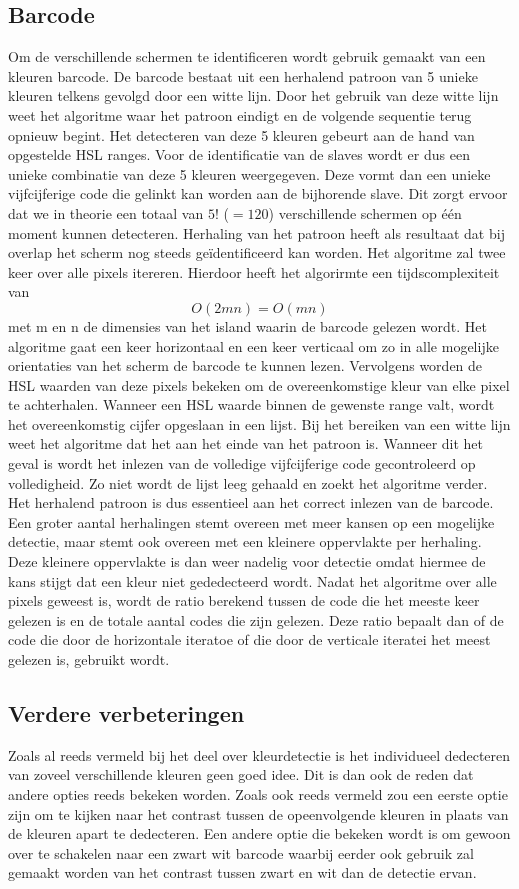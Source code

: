  \subsection{Barcode}
Om de verschillende schermen te identificeren wordt gebruik gemaakt van een kleuren barcode. De barcode bestaat uit een herhalend patroon van 5 unieke kleuren telkens gevolgd door een witte lijn. Door het gebruik van deze witte lijn weet het algoritme waar het patroon eindigt en de volgende sequentie terug opnieuw begint. Het detecteren van deze 5 kleuren gebeurt aan de hand van opgestelde HSL ranges. Voor de identificatie van de slaves wordt er dus een unieke combinatie van deze 5 kleuren weergegeven. Deze vormt dan een unieke vijfcijferige code die gelinkt kan worden aan de bijhorende slave. Dit zorgt ervoor dat we in theorie een totaal van $5!$ ($=120$) verschillende schermen op één moment kunnen detecteren. Herhaling van het patroon heeft als resultaat dat bij overlap het scherm nog steeds geïdentificeerd kan worden. Het algoritme zal twee keer over alle pixels itereren. Hierdoor heeft het algorirmte een tijdscomplexiteit van
\[O(2mn)=O(mn)\]
met m en n de dimensies van het island waarin de barcode gelezen wordt. Het algoritme gaat een keer horizontaal en een keer verticaal om zo in alle mogelijke orientaties van het scherm de barcode te kunnen lezen. Vervolgens worden de HSL waarden van deze pixels bekeken om de overeenkomstige kleur van elke pixel te achterhalen. Wanneer een HSL waarde binnen de gewenste range valt, wordt het overeenkomstig cijfer opgeslaan in een lijst. Bij het bereiken van een witte lijn weet het algoritme dat het aan het einde van het patroon is. Wanneer dit het geval is wordt het inlezen van de volledige vijfcijferige code gecontroleerd op volledigheid. Zo niet wordt de lijst leeg gehaald en zoekt het algoritme verder. Het herhalend patroon is dus essentieel aan het correct inlezen van de barcode. Een groter aantal herhalingen stemt overeen met meer kansen op een mogelijke detectie, maar stemt ook overeen met een kleinere oppervlakte per herhaling. Deze kleinere oppervlakte is dan weer nadelig voor detectie omdat hiermee de kans stijgt dat een kleur niet gededecteerd wordt. Nadat het algoritme over alle pixels geweest is, wordt de ratio berekend tussen de code die het meeste keer gelezen is en de totale aantal codes die zijn gelezen. Deze ratio bepaalt dan of de code die door de horizontale iteratoe of die door de verticale iteratei het meest gelezen is, gebruikt wordt.

\subsection{Verdere verbeteringen}
Zoals al reeds vermeld bij het deel over kleurdetectie is het individueel dedecteren van zoveel verschillende kleuren geen goed idee. Dit is dan ook de reden dat andere opties reeds bekeken worden. Zoals ook reeds vermeld zou een eerste optie zijn om te kijken naar het contrast tussen de opeenvolgende kleuren in plaats van de kleuren apart te dedecteren. Een andere optie die bekeken wordt is om gewoon over te schakelen naar een zwart wit barcode waarbij eerder ook gebruik zal gemaakt worden van het contrast tussen zwart en wit dan de detectie ervan.
